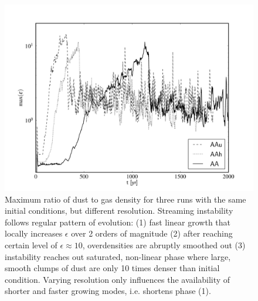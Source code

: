 \begin{figure}
   \includegraphics[width=0.98\linewidth]{figures/fig4}
   \caption{Maximum ratio of dust to gas density for three runs with the same
      initial conditions, but different resolution. Streaming instability
      follows regular pattern of evolution: (1) fast linear growth that locally
      increases $\epsilon$ over 2 orders of magnitude (2) after reaching certain
      level of $\epsilon \approx 10$, overdensities are abruptly smoothed out
      (3) instability reaches out saturated, non-linear phase where large,
      smooth clumps of dust are only 10 times denser than initial condition.
      Varying resolution only influences the availability of shorter and faster
      growing modes, i.e. shortens phase (1).  }
   \label{fig4}
\end{figure}
%

